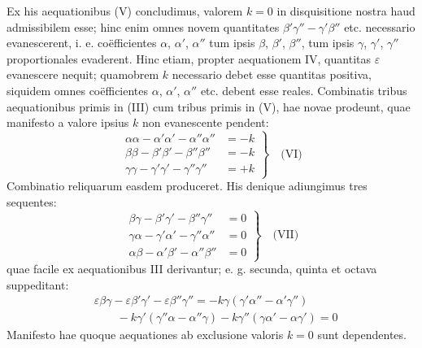 Ex his aequationibus (V) concludimus, valorem $k=0$ in disquisitione
nostra haud admissibilem esse; hinc enim omnes novem quantitates $\beta'\gamma''-\gamma'\beta''$ etc.
necessario evanescerent, i. e. coëfficientes $\alpha$, $\alpha'$, $\alpha''$ tum ipsis $\beta$, $\beta'$, $\beta''$, tum ipsis
$\gamma$, $\gamma'$, $\gamma''$ proportionales evaderent. Hinc etiam, propter aequationem IV, quantitas $\varepsilon$ evanescere nequit; quamobrem $k$ necessario debet esse quantitas positiva,
siquidem omnes coëfficientes $\alpha$, $\alpha'$, $\alpha''$ etc. debent esse reales. Combinatis tribus
aequationibus primis in (III) cum tribus primis in (V), hae novae prodeunt, quae
manifesto a valore ipsius $k$ non evanescente pendent:
\[
\left.\begin{aligned}
\alpha\alpha-\alpha'\alpha'-\alpha''\alpha''&=-k\\[5pt]
\beta\beta-\beta'\beta'-\beta''\beta''&=-k\\[5pt]
\gamma\gamma-\gamma'\gamma'-\gamma''\gamma''&=+k
\end{aligned}\right\}\quad\text{(VI)}
\]
Combinatio reliquarum easdem produceret. His denique adiungimus tres sequentes:
\[
\left.\begin{aligned}
\beta\gamma-\beta'\gamma'-\beta''\gamma''&=0\\[5pt]
\gamma\alpha-\gamma'\alpha'-\gamma''\alpha''&=0\\[5pt]
\alpha\beta-\alpha'\beta'-\alpha''\beta''&=0
\end{aligned}\right\}\quad\text{(VII)}
\]
quae facile ex aequationibus III derivantur; e. g. secunda, quinta et octava suppeditant:
\[
\begin{aligned}
&\varepsilon\beta\gamma-\varepsilon\beta'\gamma'-\varepsilon\beta''\gamma''=-k\gamma(\gamma'\alpha''-\alpha'\gamma'')\\[6pt]
&\qquad{}-k\gamma'(\gamma''\alpha-\alpha''\gamma)-k\gamma''(\gamma\alpha'-\alpha\gamma')=0
\end{aligned}
\]
Manifesto hae quoque aequationes ab exclusione valoris $k=0$ sunt dependentes.

